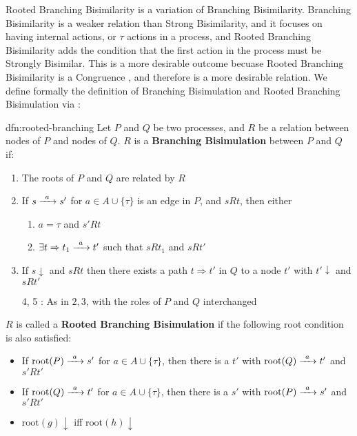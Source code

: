 \documentclass[../hons_project.tex]{subfiles}
\begin{document}
Rooted Branching Bisimilarity is a variation of Branching Bisimilarity. Branching Bisimilarity is a weaker relation than Strong Bisimilarity, and it focuses on having internal actions, or $\tau$ actions in a process, and Rooted Branching Bisimilarity adds the condition that the first action in the process must be Strongly Bisimilar. This is a more desirable outcome becuase Rooted Branching Bisimilarity is a Congruence \citep{fokkinkRootedBranchingBisimulation2000}, and therefore is a more desirable relation. We define formally the definition of Branching Bisimulation and Rooted Branching Bisimulation via \cite{baetenProcessAlgebra1990}:

\begin{dfn}{dfn:rooted-branching}{}
   Let $P$ and $Q$ be two processes, and $R$ be a relation between nodes of $P$ and nodes of $Q$. $R$ is a \textbf{Branching Bisimulation} between $P$ and $Q$ if:
   \begin{enumerate}
      \item The roots of $P$ and $Q$ are related by $R$
      \item If $s \prightarrow{a} s'$ for $a\in A \cup \{\tau\}$ is an edge in $P$, and $s R t$, then either
	 \begin{enumerate}[label=\alph*)]
	    \item $a= \tau$ and $s' R t$
	    \item $\exists t \Rightarrow t_{1} \prightarrow{a} t'$ such that $s R t_{1}$ and $s R t'$
	 \end{enumerate}
      \item If $s \downarrow$ and $s R t$ then there exists a path $t \Rightarrow t'$ in $Q$ to a node $t'$ with $t'\downarrow$ and $s R t'$
      \item[4, 5]: As in $2, 3$, with the roles of $P$ and $Q$ interchanged
   \end{enumerate}

   \longrule{0.08ex}

   $R$ is called a \textbf{Rooted Branching Bisimulation} if the following root condition is also satisfied:
   \begin{itemize}
      \item If $\mathrm{root}(P) \prightarrow{a} s'$ for $a\in A \cup \{\tau\}$, then there is a $t'$ with $\mathrm{root}(Q)\prightarrow{a} t'$ and $s' R t'$
      \item If $\mathrm{root}(Q) \prightarrow{a} t'$ for $a\in A \cup \{\tau\}$, then there is a $s'$ with $\mathrm{root}(P)\prightarrow{a} s'$ and $s' R t'$
      \item $\mathrm{root}(g)\downarrow$ iff $\mathrm{root}(h)\downarrow$
   \end{itemize}
\end{dfn}
\end{document}
